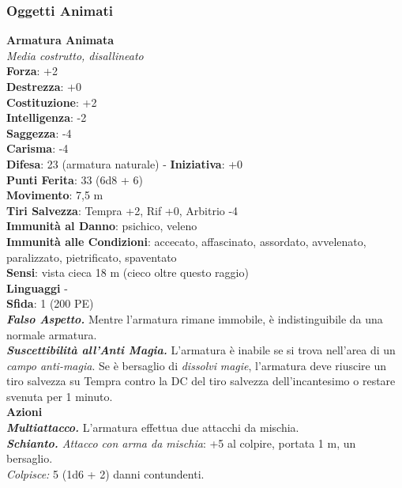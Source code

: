 \begin{multicols}{2}
\subsubsection{Oggetti Animati}

\medskip\textbf{Armatura Animata}\\
\emph{Media costrutto, disallineato}\\
\textbf{Forza}: +2\\
\textbf{Destrezza}: +0\\
\textbf{Costituzione}: +2\\
\textbf{Intelligenza}: -2\\
\textbf{Saggezza}: -4\\
\textbf{Carisma}: -4\\
\textbf{Difesa}: 23 (armatura naturale) - \textbf{Iniziativa}: +0\\
\textbf{Punti Ferita}: 33 (6d8 + 6)\\
\textbf{Movimento}: 7,5 m\\
\textbf{Tiri Salvezza}: Tempra +2, Rif +0, Arbitrio -4\\
\textbf{Immunità al Danno}: psichico, veleno\\
\textbf{Immunità alle Condizioni}: accecato, affascinato, assordato, avvelenato, paralizzato, pietrificato, spaventato \\
\textbf{Sensi}: vista cieca 18 m (cieco oltre questo raggio)\\
\textbf{Linguaggi} -\\
\textbf{Sfida}: 1 (200 PE)\smallskip\\
\emph{\textbf{Falso Aspetto.}} Mentre l'armatura rimane immobile, è indistinguibile da una normale armatura.\\
\emph{\textbf{Suscettibilità all'Anti Magia.}} L'armatura è inabile se si trova nell'area di un \emph{campo anti-magia}. Se è bersaglio di \emph{dissolvi} \emph{magie}, l'armatura deve riuscire un tiro salvezza su Tempra contro la DC del tiro salvezza dell'incantesimo o restare svenuta per 1 minuto.\\
\smallskip\textbf{Azioni}\\
\emph{\textbf{Multiattacco.}} L'armatura effettua due attacchi da mischia.\\
\emph{\textbf{Schianto.} Attacco con arma da mischia}: +5 al colpire, portata 1 m, un bersaglio.\\
\emph{Colpisce:} 5 (1d6 + 2) danni contundenti.\\


\end{multicols}
